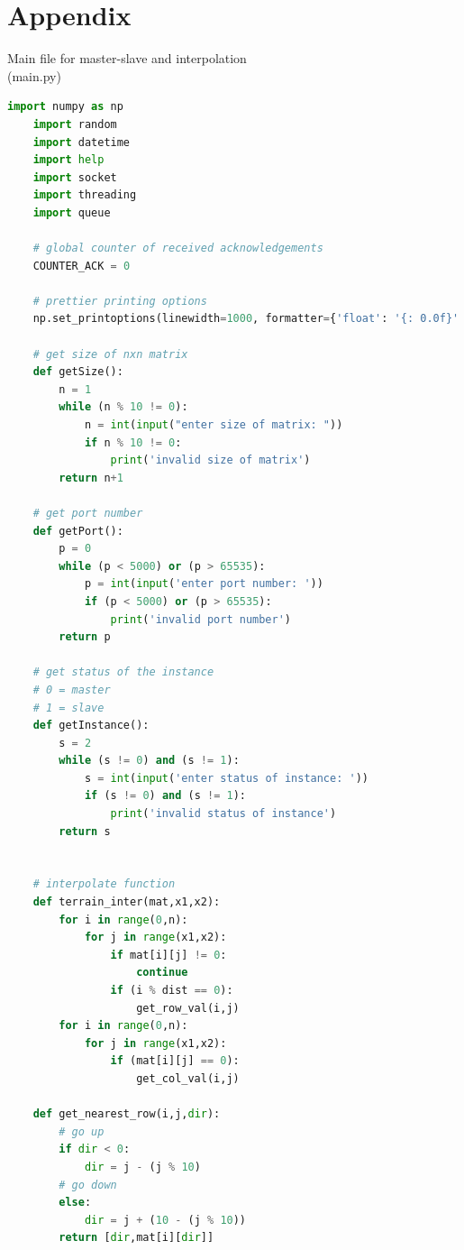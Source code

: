 \documentclass{article}
\begin{document}
\printbibliography{}


\pagebreak
\section*{\centering Appendix}
\begin{center}
Main file for master-slave and interpolation \\ (main.py)
\end{center}
\begin{lstlisting}[language=Python]
    import numpy as np
    import random
    import datetime
    import help
    import socket
    import threading
    import queue

    # global counter of received acknowledgements
    COUNTER_ACK = 0

    # prettier printing options
    np.set_printoptions(linewidth=1000, formatter={'float': '{: 0.0f}'.format})

    # get size of nxn matrix
    def getSize():
        n = 1
        while (n % 10 != 0):
            n = int(input("enter size of matrix: "))
            if n % 10 != 0:
                print('invalid size of matrix')
        return n+1

    # get port number
    def getPort():
        p = 0
        while (p < 5000) or (p > 65535):
            p = int(input('enter port number: '))
            if (p < 5000) or (p > 65535):
                print('invalid port number')
        return p

    # get status of the instance
    # 0 = master
    # 1 = slave
    def getInstance():
        s = 2
        while (s != 0) and (s != 1):
            s = int(input('enter status of instance: '))
            if (s != 0) and (s != 1):
                print('invalid status of instance')
        return s


    # interpolate function
    def terrain_inter(mat,x1,x2):
        for i in range(0,n):
            for j in range(x1,x2):
                if mat[i][j] != 0:
                    continue
                if (i % dist == 0):
                    get_row_val(i,j)
        for i in range(0,n):
            for j in range(x1,x2):
                if (mat[i][j] == 0):
                    get_col_val(i,j)

    def get_nearest_row(i,j,dir):
        # go up
        if dir < 0:
            dir = j - (j % 10)
        # go down
        else:
            dir = j + (10 - (j % 10))
        return [dir,mat[i][dir]]


\end{lstlisting}
\end{document}
